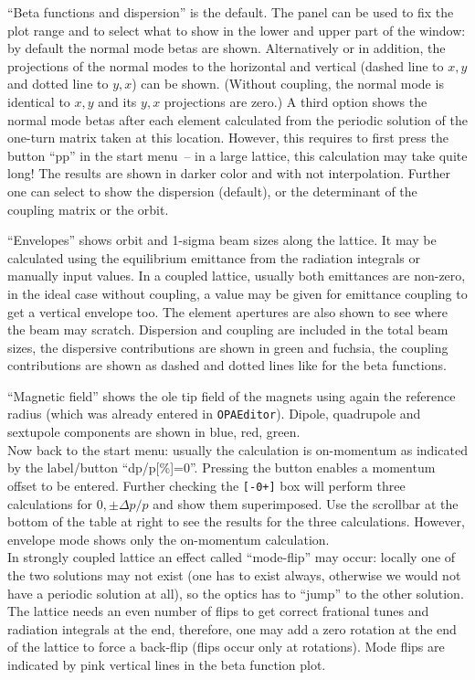 \documentclass[12pt]{article}
\begin{document}
``Beta functions and dispersion'' is the default. The panel can be used to fix the plot range and to select what to show in the lower and upper part of the window: by default the normal mode betas are shown. Alternatively or in addition, the projections of the normal modes to the horizontal and vertical (dashed line to $x,y$ and dotted line to $y,x$) can be shown. (Without coupling, the normal mode is identical to $x,y$ and its $y,x$ projections are zero.) A third option shows the normal mode betas after each element calculated from the periodic solution of the one-turn matrix taken at this location. However, this requires to first press the button ``pp'' in the start menu~-- in a large lattice, this calculation may take quite long! The results are shown in darker color and with not interpolation.
Further one can select to show the dispersion (default), or the determinant of the coupling matrix or the orbit.

``Envelopes'' shows orbit and 1-sigma beam sizes along the lattice. It may be calculated using the equilibrium emittance from the radiation integrals or manually input values. In a coupled lattice, usually both emittances are non-zero, in the ideal case without coupling, a value may be given for emittance coupling to get a vertical envelope too.
The element apertures are also shown to see where the beam may scratch. Dispersion and coupling are included in the total beam sizes, the dispersive contributions are shown in green and fuchsia, the coupling contributions are shown as dashed and dotted lines like for the beta functions.

``Magnetic field'' shows the ole tip field of the magnets using again the reference radius (which was already entered in {\tt OPAEditor}). Dipole, quadrupole and sextupole components are shown in blue, red, green.\\

Now back to the start menu: usually the calculation is on-momentum as indicated by the label/button ``dp/p[\%]=0''. Pressing the button enables a momentum offset to be entered. Further checking the {\tt [-0+]} box will perform three calculations for $0,\pm \Delta p/p$ and show them superimposed. Use the scrollbar at the bottom of the table at right to see the results for the three calculations. 
However, envelope mode shows only the on-momentum calculation.\\

In strongly coupled lattice an effect called ``mode-flip'' may occur: locally one of the two solutions may not exist (one has to exist always, otherwise we would not have a periodic solution at all), so the optics has to ``jump'' to the other solution. The lattice needs an even number of flips to get correct frational tunes and radiation integrals at the end, therefore, one may add a zero rotation at the end of the lattice to force a back-flip (flips occur only at rotations). Mode flips are indicated by pink vertical lines in the beta function plot.
\end{document}
